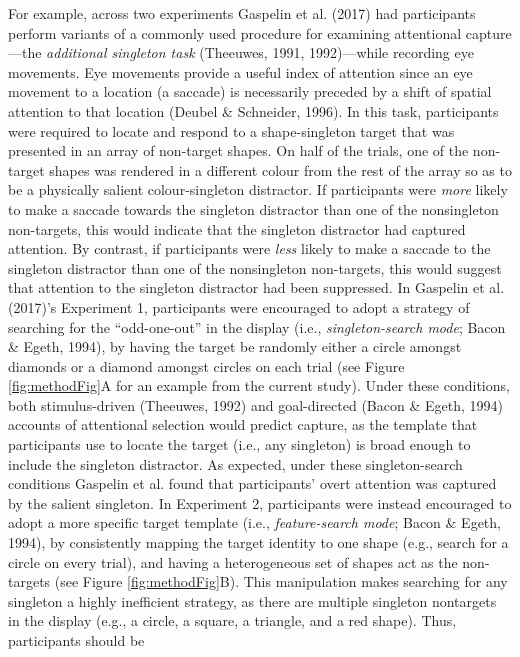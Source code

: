 \documentclass[man, a4paper, noextraspace, 11pt,floatsintext]{apa6}
\theoremstyle{definition}
\theoremstyle{definition}
\theoremstyle{definition}
\theoremstyle{remark}
\begin{document}
For example, across two experiments Gaspelin et al. (2017) had
participants perform variants of a commonly used procedure for examining
attentional capture---the \emph{additional singleton task} (Theeuwes,
1991, 1992)---while recording eye movements. Eye movements provide a
useful index of attention since an eye movement to a location (a
saccade) is necessarily preceded by a shift of spatial attention to that
location (Deubel \& Schneider, 1996). In this task, participants were
required to locate and respond to a shape-singleton target that was
presented in an array of non-target shapes. On half of the trials, one
of the non-target shapes was rendered in a different colour from the
rest of the array so as to be a physically salient colour-singleton
distractor. If participants were \emph{more} likely to make a saccade
towards the singleton distractor than one of the nonsingleton
non-targets, this would indicate that the singleton distractor had
captured attention. By contrast, if participants were \emph{less} likely
to make a saccade to the singleton distractor than one of the
nonsingleton non-targets, this would suggest that attention to the
singleton distractor had been suppressed. In Gaspelin et al. (2017)'s
Experiment 1, participants were encouraged to adopt a strategy of
searching for the \enquote{odd-one-out} in the display (i.e.,
\emph{singleton-search mode}; Bacon \& Egeth, 1994), by having the
target be randomly either a circle amongst diamonds or a diamond amongst
circles on each trial (see Figure \ref{fig:methodFig}A for an example
from the current study). Under these conditions, both stimulus-driven
(Theeuwes, 1992) and goal-directed (Bacon \& Egeth, 1994) accounts of
attentional selection would predict capture, as the template that
participants use to locate the target (i.e., any singleton) is broad
enough to include the singleton distractor. As expected, under these
singleton-search conditions Gaspelin et al. found that participants'
overt attention was captured by the salient singleton. In Experiment 2,
participants were instead encouraged to adopt a more specific target
template (i.e., \emph{feature-search mode}; Bacon \& Egeth, 1994), by
consistently mapping the target identity to one shape (e.g., search for
a circle on every trial), and having a heterogeneous set of shapes act
as the non-targets (see Figure \ref{fig:methodFig}B). This manipulation
makes searching for any singleton a highly inefficient strategy, as
there are multiple singleton nontargets in the display (e.g., a circle,
a square, a triangle, and a red shape). Thus, participants should be
\end{document}
